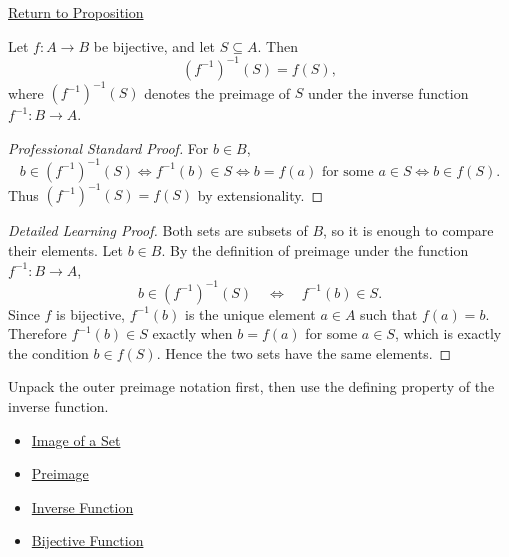 \newpage
{}
\label{prf:preimage-under-inverse-function}

\begin{remark*}[Return]
\hyperref[prop:preimage-under-inverse-function]{Return to Proposition}
\end{remark*}

\begin{proposition*}
Let $f:A\to B$ be bijective, and let $S\subseteq A$. Then
\[
(f^{-1})^{-1}(S)=f(S),
\]
where $(f^{-1})^{-1}(S)$ denotes the preimage of $S$ under the inverse
function $f^{-1}:B\to A$.
\end{proposition*}

\begin{proof}[Professional Standard Proof]
\LRAProofBodyStart
For $b\in B$,
\[
b\in (f^{-1})^{-1}(S)
\iff f^{-1}(b)\in S
\iff b=f(a)\text{ for some }a\in S
\iff b\in f(S).
\]
Thus $(f^{-1})^{-1}(S)=f(S)$ by extensionality.
\end{proof}

\begin{proof}[Detailed Learning Proof]
\LRAProofBodyStart
Both sets are subsets of $B$, so it is enough to compare their elements. Let
$b\in B$. By the definition of preimage under the function $f^{-1}:B\to A$,
\[
b\in (f^{-1})^{-1}(S)
\quad\Longleftrightarrow\quad
f^{-1}(b)\in S.
\]
Since $f$ is bijective, $f^{-1}(b)$ is the unique element $a\in A$ such that
$f(a)=b$. Therefore $f^{-1}(b)\in S$ exactly when $b=f(a)$ for some
$a\in S$, which is exactly the condition $b\in f(S)$. Hence the two sets have
the same elements.
\end{proof}

\begin{remark*}
Unpack the outer preimage notation first, then use the defining property of
the inverse function.
\end{remark*}

\begin{dependencies}
\begin{itemize}
  \item \hyperref[def:image-set]{Image of a Set}
  \item \hyperref[def:preimage]{Preimage}
  \item \hyperref[def:inverse]{Inverse Function}
  \item \hyperref[def:bijective]{Bijective Function}
\end{itemize}
\end{dependencies}

\clearpage
